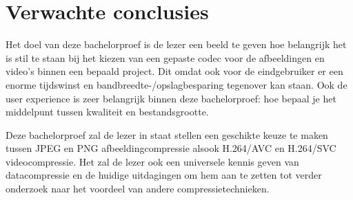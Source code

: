 \section{Verwachte conclusies}
\label{sec:verwachte_conclusies}

Het doel van deze bachelorproef is de lezer een beeld te geven hoe belangrijk het is stil te staan bij het kiezen van een gepaste codec voor de afbeeldingen en video's binnen een bepaald project. Dit omdat ook voor de eindgebruiker er een enorme tijdswinst en bandbreedte-/opslagbesparing tegenover kan staan. Ook de user experience is zeer belangrijk binnen deze bachelorproef: hoe bepaal je het middelpunt tussen kwaliteit en bestandsgrootte. 

Deze bachelorproef zal de lezer in staat stellen een geschikte keuze te maken tussen JPEG en PNG afbeeldingcompressie alsook H.264/AVC en H.264/SVC videocompressie. Het zal de lezer ook een universele kennis geven van datacompressie en de huidige uitdagingen om hem aan te zetten tot verder onderzoek naar het voordeel van andere compressietechnieken. 